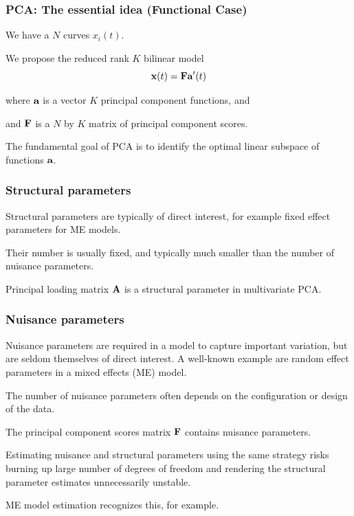 \documentclass[11pt]{beamer}
\begin{document}
\begin{frame}

\frametitle{PCA: The essential idea (Functional Case)}

\bi
  \item We have a $N$ curves $x_i(t)$.
  \item We propose the reduced rank $K$ bilinear model
  \[
    \mbox{\bf x}(t) = \mbox{\bf F} \mbox{\bf a}'(t)
  \]
  \item where $\mbox{\bf a}$ is a vector $K$ principal component functions, and
  \item and $\mbox{\bf F}$ is a $N$ by $K$ matrix of principal component scores.
  \item The fundamental goal of PCA is to identify the optimal linear subspace of functions 
  $\mbox{\bf a}$.
\ei

\end{frame}


\begin{frame}

\frametitle{Structural parameters}

\bi
  \item Structural parameters are typically of direct interest, for example fixed effect parameters for ME models.
  \item Their number is usually fixed, and typically much smaller than the number of nuisance parameters.
  \item Principal loading matrix $\mbox{\bf A}$ is a structural parameter in multivariate PCA.
\ei

\end{frame}


\begin{frame}

\frametitle{Nuisance parameters}

\bi
  \item Nuisance parameters are required in a model to capture important variation, but are seldom themselves of direct interest.  A well-known example are random effect parameters in a mixed effects (ME) model.
  \item The number of nuisance parameters often depends on the configuration or design of the data.
  \item The principal component scores matrix $\mbox{\bf F}$ contains nuisance parameters.
  \item Estimating nuisance and structural parameters using the same strategy risks burning up large number of degrees of freedom and rendering the structural parameter estimates unnecessarily unstable.  
  \item ME model estimation recognizes this, for example.
\ei

\end{frame}
\end{document}
